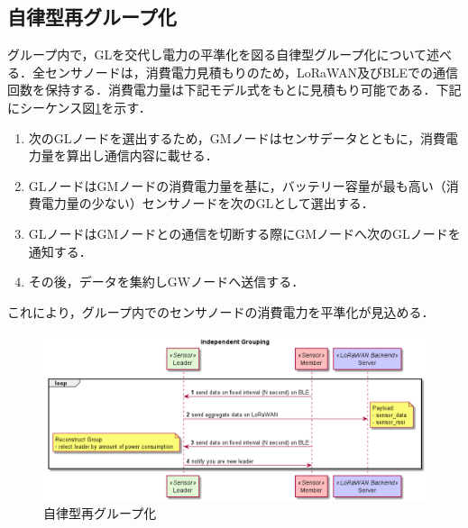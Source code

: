 \subsection{自律型再グループ化}
グループ内で，GLを交代し電力の平準化を図る自律型グループ化について述べる．全センサノードは，消費電力見積もりのため，LoRaWAN及びBLEでの通信回数を保持する．消費電力量は下記モデル式をもとに見積もり可能である．下記にシーケンス図\ref{fig:group_reconstruction_independently}を示す．

\begin{enumerate}
    \item 次のGLノードを選出するため，GMノードはセンサデータとともに，消費電力量を算出し通信内容に載せる．
    \item GLノードはGMノードの消費電力量を基に，バッテリー容量が最も高い（消費電力量の少ない）センサノードを次のGLとして選出する．
    \item GLノードはGMノードとの通信を切断する際にGMノードへ次のGLノードを通知する．
    \item その後，データを集約しGWノードへ送信する．
\end{enumerate}

これにより，グループ内でのセンサノードの消費電力を平準化が見込める．

\begin{figure}[]
    \begin{center}
    \includegraphics[width=14cm]{figures/グループ化_自律的.png}
    \caption{自律型再グループ化}
    \label{fig:group_reconstruction_independently}
    \end{center}
\end{figure}